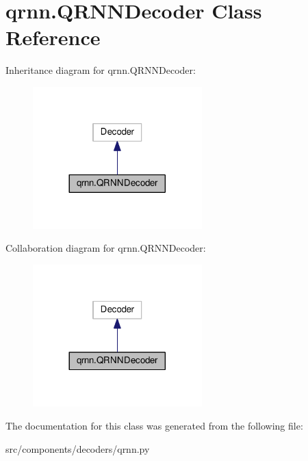 \hypertarget{classqrnn_1_1QRNNDecoder}{}\section{qrnn.\+Q\+R\+N\+N\+Decoder Class Reference}
\label{classqrnn_1_1QRNNDecoder}


Inheritance diagram for qrnn.\+Q\+R\+N\+N\+Decoder\+:
\nopagebreak
\begin{figure}[H]
\begin{center}
\leavevmode
\includegraphics[width=185pt]{classqrnn_1_1QRNNDecoder__inherit__graph}
\end{center}
\end{figure}


Collaboration diagram for qrnn.\+Q\+R\+N\+N\+Decoder\+:
\nopagebreak
\begin{figure}[H]
\begin{center}
\leavevmode
\includegraphics[width=185pt]{classqrnn_1_1QRNNDecoder__coll__graph}
\end{center}
\end{figure}


The documentation for this class was generated from the following file\+:\begin{DoxyCompactItemize}
\item 
src/components/decoders/qrnn.\+py\end{DoxyCompactItemize}

